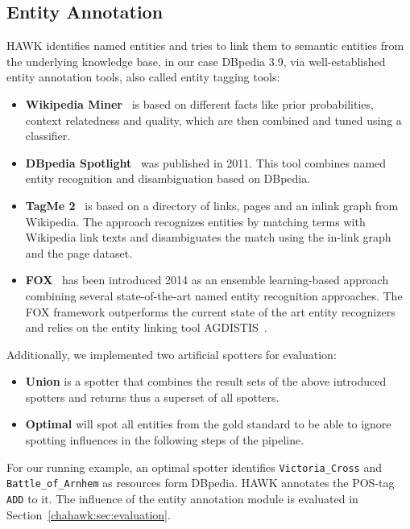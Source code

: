 \subsection{Entity Annotation}
HAWK identifies named entities and tries to link them to semantic entities from the underlying knowledge base, in our case DBpedia 3.9, via well-established entity annotation tools, also called entity tagging tools:
\begin{itemize}
\item \textbf{Wikipedia Miner}~\cite{milne2008learning} is based on different facts like prior probabilities, context relatedness and quality, which are then combined and tuned using a classifier.
\item \textbf{DBpedia Spotlight}~\cite{spotlight} %
was published in 2011. 
This tool combines named entity recognition and disambiguation based on DBpedia.
\item \textbf{TagMe 2}~\cite{TagMe2} is based on a directory of links, pages and an inlink graph from Wikipedia.
The approach recognizes entities by matching terms with Wikipedia link texts and disambiguates the match using the in-link graph and the page dataset.
\item \textbf{FOX}~\cite{FOX} has been introduced 2014 as an ensemble learning-based approach combining several state-of-the-art named entity recognition approaches. 
The FOX framework outperforms the current state of the art entity recognizers and relies on the entity linking tool AGDISTIS~\cite{agdistis_iswc}.
\end{itemize}
Additionally, we implemented two artificial spotters for evaluation:
\begin{itemize}
\item \textbf{Union} is a spotter that combines the result sets of the above introduced spotters and returns thus a superset of all spotters.
\item \textbf{Optimal} will spot all entities from the gold standard to be able to ignore spotting influences in the following steps of the pipeline.
\end{itemize}

For our running example, an optimal spotter identifies \texttt{Victoria\_Cross} and \texttt{Battle\_of\_Arnhem} as resources form DBpedia.
HAWK annotates the POS-tag \texttt{ADD} to it. %
The influence of the entity annotation module is evaluated in Section~\ref{chahawk:sec:evaluation}.

